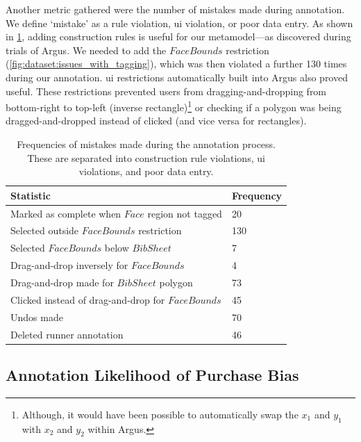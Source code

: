 Another metric gathered were the number of mistakes made during annotation. We define `mistake' as a rule violation, \gls{ui} violation, or poor data entry. As shown in \cref{tab:dataset:argus:metrics:mistakes}, adding construction rules is useful for our metamodel---as discovered during trials of Argus. We needed to add the $FaceBounds$ restriction (\cref{fig:dataset:issues_with_tagging}), which was then violated a further 130 times during our annotation. \gls{ui} restrictions automatically built into Argus also proved useful. These restrictions  prevented users from dragging-and-dropping from bottom-right to top-left (inverse rectangle)\footnote{Although, it would have been possible to automatically swap the $x_{1}$ and $y_{1}$ with $x_{2}$ and $y_{2}$ within Argus.} or checking if a polygon was being dragged-and-dropped instead of clicked (and vice versa for rectangles).

\begin{table}[p]
  \centering
  \caption[Mistakes using Argus]{Frequencies of mistakes made during the annotation process. These are separated into construction rule violations, \gls{ui} violations, and poor data entry.}
  \label{tab:dataset:argus:metrics:mistakes}
  \begin{tabular}{@{}ll@{}}
    \toprule
    \textbf{Statistic}                                & \textbf{Frequency} \\ \midrule
    Marked as complete when $Face$ region not tagged  & 20                 \\
    Selected outside $FaceBounds$ restriction         & 130                \\
    Selected $FaceBounds$ below $BibSheet$            & 7                  \\
    \midrule
    Drag-and-drop inversely for $FaceBounds$          & 4                  \\
    Drag-and-drop made for $BibSheet$ polygon         & 73                 \\
    Clicked instead of drag-and-drop for $FaceBounds$ & 45                 \\
    \midrule
    Undos made                                        & 70                 \\
    Deleted runner annotation                         & 46                 \\ \bottomrule
  \end{tabular}
\end{table}

\subsection{Annotation Likelihood of Purchase Bias}

